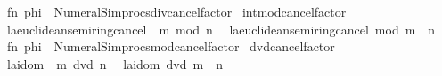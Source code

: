 \begin{isabellebody}
\ \ {\isacartoucheopen}fn\ phi\ {\isacharequal}{\kern0pt}{\isachargreater}{\kern0pt}\ Numeral{\isacharunderscore}{\kern0pt}Simprocs{\isachardot}{\kern0pt}div{\isacharunderscore}{\kern0pt}cancel{\isacharunderscore}{\kern0pt}factor{\isacartoucheclose}\isanewline
\isanewline
{}\isamarkupfalse%
\ int{\isacharunderscore}{\kern0pt}mod{\isacharunderscore}{\kern0pt}cancel{\isacharunderscore}{\kern0pt}factor\isanewline
\ \ {\isacharparenleft}{\kern0pt}{\isachardoublequoteopen}{\isacharparenleft}{\kern0pt}{\isacharparenleft}{\kern0pt}l{\isacharcolon}{\kern0pt}{\isacharcolon}{\kern0pt}{\isacharprime}{\kern0pt}a{\isacharcolon}{\kern0pt}{\isacharcolon}{\kern0pt}euclidean{\isacharunderscore}{\kern0pt}semiring{\isacharunderscore}{\kern0pt}cancel{\isacharparenright}{\kern0pt}\ {\isacharasterisk}{\kern0pt}\ m{\isacharparenright}{\kern0pt}\ mod\ n{\isachardoublequoteclose}\isanewline
\ \ {\isacharbar}{\kern0pt}{\isachardoublequoteopen}{\isacharparenleft}{\kern0pt}l{\isacharcolon}{\kern0pt}{\isacharcolon}{\kern0pt}{\isacharprime}{\kern0pt}a{\isacharcolon}{\kern0pt}{\isacharcolon}{\kern0pt}euclidean{\isacharunderscore}{\kern0pt}semiring{\isacharunderscore}{\kern0pt}cancel{\isacharparenright}{\kern0pt}\ mod\ {\isacharparenleft}{\kern0pt}m\ {\isacharasterisk}{\kern0pt}\ n{\isacharparenright}{\kern0pt}{\isachardoublequoteclose}{\isacharparenright}{\kern0pt}\ {\isacharequal}{\kern0pt}\isanewline
\ \ {\isacartoucheopen}fn\ phi\ {\isacharequal}{\kern0pt}{\isachargreater}{\kern0pt}\ Numeral{\isacharunderscore}{\kern0pt}Simprocs{\isachardot}{\kern0pt}mod{\isacharunderscore}{\kern0pt}cancel{\isacharunderscore}{\kern0pt}factor{\isacartoucheclose}\isanewline
\isanewline
{}\isamarkupfalse%
\ dvd{\isacharunderscore}{\kern0pt}cancel{\isacharunderscore}{\kern0pt}factor\isanewline
\ \ {\isacharparenleft}{\kern0pt}{\isachardoublequoteopen}{\isacharparenleft}{\kern0pt}{\isacharparenleft}{\kern0pt}l{\isacharcolon}{\kern0pt}{\isacharcolon}{\kern0pt}{\isacharprime}{\kern0pt}a{\isacharcolon}{\kern0pt}{\isacharcolon}{\kern0pt}idom{\isacharparenright}{\kern0pt}\ {\isacharasterisk}{\kern0pt}\ m{\isacharparenright}{\kern0pt}\ dvd\ n{\isachardoublequoteclose}\isanewline
\ \ {\isacharbar}{\kern0pt}{\isachardoublequoteopen}{\isacharparenleft}{\kern0pt}l{\isacharcolon}{\kern0pt}{\isacharcolon}{\kern0pt}{\isacharprime}{\kern0pt}a{\isacharcolon}{\kern0pt}{\isacharcolon}{\kern0pt}idom{\isacharparenright}{\kern0pt}\ dvd\ {\isacharparenleft}{\kern0pt}m\ {\isacharasterisk}{\kern0pt}\ n{\isacharparenright}{\kern0pt}{\isachardoublequoteclose}{\isacharparenright}{\kern0pt}\ {\isacharequal}{\kern0pt}\isanewline

\end{isabellebody}
